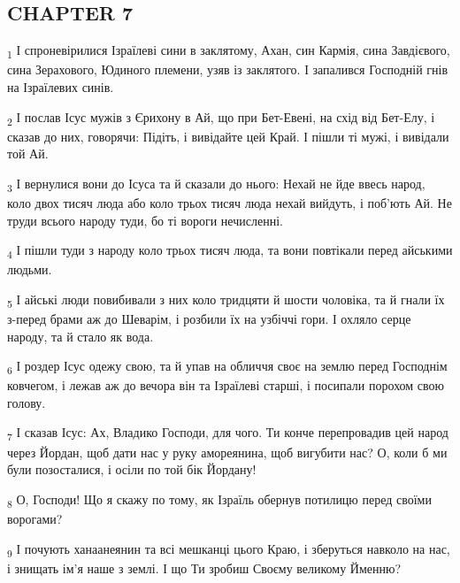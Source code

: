 \subsection{CHAPTER 7}
\begin{tcolorbox}
\textsubscript{1} І спроневірилися Ізраїлеві сини в заклятому, Ахан, син Кармія, сина Завдієвого, сина Зерахового, Юдиного племени, узяв із заклятого. І запалився Господній гнів на Ізраїлевих синів.
\end{tcolorbox}
\begin{tcolorbox}
\textsubscript{2} І послав Ісус мужів з Єрихону в Ай, що при Бет-Евені, на схід від Бет-Елу, і сказав до них, говорячи: Підіть, і вивідайте цей Край. І пішли ті мужі, і вивідали той Ай.
\end{tcolorbox}
\begin{tcolorbox}
\textsubscript{3} І вернулися вони до Ісуса та й сказали до нього: Нехай не йде ввесь народ, коло двох тисяч люда або коло трьох тисяч люда нехай вийдуть, і поб'ють Ай. Не труди всього народу туди, бо ті вороги нечисленні.
\end{tcolorbox}
\begin{tcolorbox}
\textsubscript{4} І пішли туди з народу коло трьох тисяч люда, та вони повтікали перед айськими людьми.
\end{tcolorbox}
\begin{tcolorbox}
\textsubscript{5} І айські люди повибивали з них коло тридцяти й шости чоловіка, та й гнали їх з-перед брами аж до Шеварім, і розбили їх на узбіччі гори. І охляло серце народу, та й стало як вода.
\end{tcolorbox}
\begin{tcolorbox}
\textsubscript{6} І роздер Ісус одежу свою, та й упав на обличчя своє на землю перед Господнім ковчегом, і лежав аж до вечора він та Ізраїлеві старші, і посипали порохом свою голову.
\end{tcolorbox}
\begin{tcolorbox}
\textsubscript{7} І сказав Ісус: Ах, Владико Господи, для чого. Ти конче перепровадив цей народ через Йордан, щоб дати нас у руку амореянина, щоб вигубити нас? О, коли б ми були позосталися, і осіли по той бік Йордану!
\end{tcolorbox}
\begin{tcolorbox}
\textsubscript{8} О, Господи! Що я скажу по тому, як Ізраїль обернув потилицю перед своїми ворогами?
\end{tcolorbox}
\begin{tcolorbox}
\textsubscript{9} І почують ханаанеянин та всі мешканці цього Краю, і зберуться навколо на нас, і знищать ім'я наше з землі. І що Ти зробиш Своєму великому Йменню?
\end{tcolorbox}
